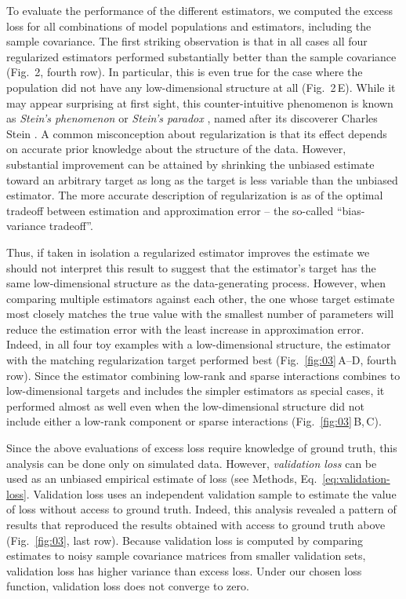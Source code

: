 \documentclass[10pt]{article}
\begin{document}
To evaluate the performance of the different estimators, we computed the excess loss for all combinations of model populations and estimators, including the sample covariance. The first striking observation is that in all cases all four regularized estimators performed substantially better than the sample covariance (Fig.~2, fourth row). In particular, this is even true for the case where the population did not have any low-dimensional structure at all (Fig.~2\,E). While it may appear surprising at first sight, this counter-intuitive phenomenon is known as \emph{Stein's phenomenon} or \emph{Stein's paradox} \cite{Efron:1977}, named after its discoverer Charles Stein \cite{Stein:1956}. A common misconception about regularization is that its effect depends on accurate prior knowledge about the structure of the data. However, substantial improvement can be attained by shrinking the unbiased estimate toward an arbitrary target as long as the target is less variable than the unbiased estimator. The more accurate description of regularization is as of the optimal tradeoff between estimation and approximation error -- the so-called ``bias-variance tradeoff''.

Thus, if taken in isolation a regularized estimator improves the estimate we should not interpret this result to suggest that the estimator's target has the same low-dimensional structure as the data-generating process. However, when comparing multiple estimators against each other, the one whose target estimate most closely matches the true value with the smallest number of parameters will reduce the estimation error with the least increase in approximation error. Indeed, in all four toy examples with a low-dimensional structure, the estimator with the matching regularization target performed best (Fig.~\ref{fig:03}\,A--D, fourth row). 
Since the estimator combining low-rank and sparse interactions combines to low-dimensional targets and includes the simpler estimators as special cases, it performed almost as well even when the low-dimensional structure did not include either a low-rank component or sparse interactions (Fig.~\ref{fig:03}\,B,\,C). 

Since the above evaluations of excess loss require knowledge of ground truth, this analysis can be done only on simulated data. However, \emph{validation loss} can be used as an unbiased empirical estimate of loss  (see Methods, Eq.~\ref{eq:validation-loss}. Validation loss uses an independent validation sample to estimate the value of loss without access to ground truth.   Indeed, this analysis revealed a pattern of results that reproduced the results obtained with access to ground truth above (Fig.~\ref{fig:03}, last row). Because validation loss is computed by comparing estimates to noisy sample covariance matrices from smaller validation sets, validation loss has higher variance than excess loss. Under our chosen loss function, validation loss does not converge to zero. 
\end{document}
